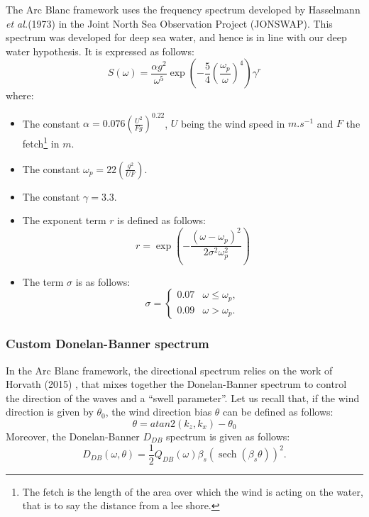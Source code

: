 \documentclass[final]{jcgt}
\def\Framework{The Arc Blanc framework\xspace}
\def\framework{the Arc Blanc framework\xspace}
\def\etal{\emph{et al.}\xspace}
\begin{document}
\Framework uses the frequency spectrum developed by Hasselmann \etal (1973) \cite{k.hasselmannMeasurementsWindwaveGrowth1973} in the Joint North Sea Observation Project (JONSWAP).
This spectrum was developed for deep sea water, and hence is in line with our deep water hypothesis.
It is expressed as follows:
\begin{equation}
	S(\omega)=\frac{\alpha g^2}{\omega^5} \exp\left(-\frac{5}{4}\left(\frac{\omega_p}{\omega}\right)^4\right)\gamma^r
\end{equation}
where:
\begin{itemize}
	\item The constant $\alpha=0.076\left(\frac{U^2}{F g}\right)^{0.22}$, $U$ being the wind speed in $m.s^{-1}$ and $F$ the fetch\footnote{The fetch is the length of the area over which the wind is acting on the water, that is to say the distance from a lee shore.} in $m$.
	\item The constant $\omega_p=22\left(\frac{g^2}{U F}\right)$.
	\item The constant $\gamma=3.3$.
	\item The exponent term $r$ is defined as follows:
	      \begin{equation}
		      r=\exp\left(-\frac{\left(\omega-\omega_p\right)^2}{2 \sigma^2 \omega_p^2}\right)
	      \end{equation}
	\item The term $\sigma$ is as follows:
	      \[
		      \sigma=\begin{cases}
			      0.07 & \omega \leq \omega_p, \\
			      0.09 & \omega>\omega_p.
		      \end{cases}
	      \]
\end{itemize}

\subsubsection{Custom Donelan-Banner spectrum}
\label{subsubsec:donelanbanner}

In \framework, the directional spectrum relies on the work of Horvath (2015) \cite{horvathEmpiricalDirectionalWave2015}, that mixes together the Donelan-Banner spectrum to control the direction of the waves and a “swell parameter”.
Let us recall that, if the wind direction is given by $\theta_0$, the wind direction bias $\theta$ can be defined as follows:
\begin{equation}
	\theta = atan2(k_z, k_x) - \theta_0
\end{equation}
Moreover, the Donelan-Banner $D_{DB}$ spectrum is given as follows:
\begin{equation}
	D_{DB}\left(\omega,\theta\right)=\frac{1}{2}Q_{DB}\left(\omega\right)\beta_s\left(\operatorname{sech}\left(\beta_s\theta\right)\right)^2.
	\label{equa:ddb}
\end{equation}
\end{document}
